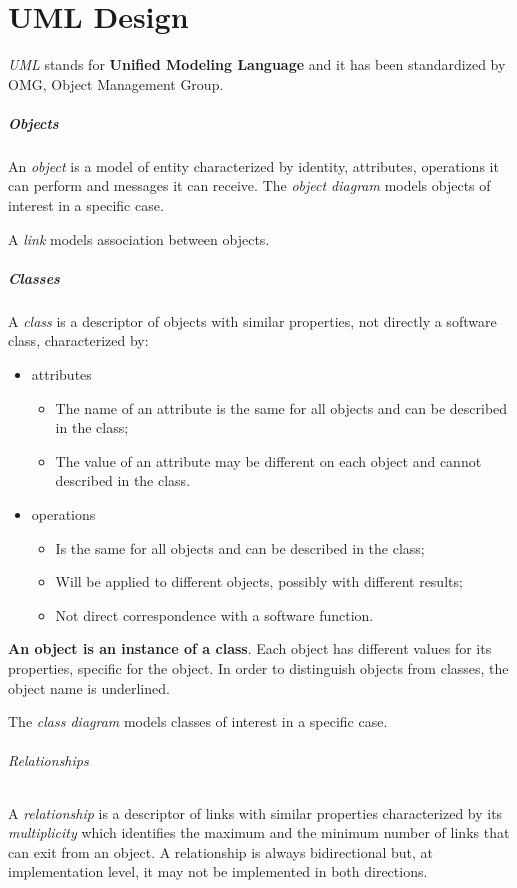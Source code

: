\chapter{UML Design}
\emph{UML} stands for \textbf{Unified Modeling Language} and it has been standardized by OMG, Object Management Group.

\paragraph{Objects}
An \emph{object} is a model of entity characterized by identity, attributes, operations it can perform and messages it can receive. The \emph{object diagram} models objects of interest in a specific case.

A \emph{link} models association between objects.

\paragraph{Classes}
A \emph{class} is a descriptor of objects with similar properties, not directly a software class, characterized by:
\begin{itemize}
\item attributes
\begin{itemize}
\item The name of an attribute is the same for all objects and can be described in the class;
\item The value of an attribute may be different on each object and cannot described in the class.
\end{itemize}
\item operations
\begin{itemize}
\item Is the same for all objects and can be described in the class;
\item Will be applied to different objects, possibly with different results;
\item Not direct correspondence with a software function.
\end{itemize}
\end{itemize}

\textbf{An object is an instance of a class}. Each object has different values for its properties, specific for the object. In order to distinguish objects from classes, the object name is underlined.

The \emph{class diagram} models classes of interest in a specific case.

\subparagraph{Relationships}
A \emph{relationship} is a descriptor of links with similar properties characterized by its \emph{multiplicity} which identifies the maximum and the minimum number of links that can exit from an object. A relationship is always bidirectional but, at implementation level, it may not be implemented in both directions.

